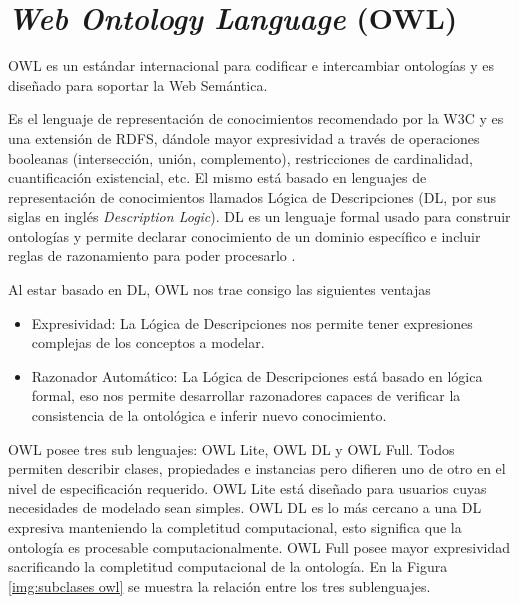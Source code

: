 \section{\textit{Web Ontology Language }(OWL)}
OWL es un estándar internacional para codificar e intercambiar ontologías y es diseñado para soportar la Web Semántica.

Es el lenguaje de representación de conocimientos recomendado por la W3C y es una extensión de RDFS, dándole mayor expresividad a través de operaciones booleanas (intersección, unión, complemento), restricciones de cardinalidad, cuantificación existencial, etc. El mismo está basado en lenguajes de representación de conocimientos llamados Lógica de Descripciones (DL, por sus siglas en inglés \textit{Description Logic}). DL es un lenguaje formal usado para construir ontologías y permite declarar conocimiento de un dominio específico e incluir reglas de razonamiento para poder procesarlo \cite{kalibatiene2011survey}.

Al estar basado en DL, OWL nos trae consigo las siguientes ventajas
\begin{itemize}
    \item Expresividad: La Lógica de Descripciones nos permite tener expresiones complejas de los conceptos a modelar.
    \item Razonador Automático: La Lógica de Descripciones está basado en lógica formal, eso nos permite desarrollar razonadores capaces de verificar la consistencia de la ontológica e inferir nuevo conocimiento.
\end{itemize}

OWL posee tres sub lenguajes: OWL Lite, OWL DL y OWL Full. Todos permiten describir clases, propiedades e instancias pero difieren uno de otro en el nivel de especificación requerido. OWL Lite está diseñado para usuarios cuyas necesidades de modelado sean simples. OWL DL es lo más cercano a una DL expresiva manteniendo la completitud computacional, esto significa que la ontología es procesable computacionalmente. OWL Full posee mayor expresividad sacrificando la completitud computacional de la ontología. En la Figura \ref{img:subclases owl} se muestra la relación entre los tres sublenguajes.

